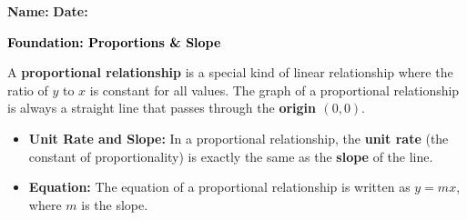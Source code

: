 \documentclass[12pt, letterpaper, fleqn]{article}
\begin{document}
\textbf{Name:} \underline{\hspace{5cm}}
\hfill
\textbf{Date:} \underline{\hspace{3cm}}\\

\begin{tcolorbox}[colback=customteal!20]
    \large\textcolor{black}{\textbf{Foundation: Proportions \& Slope}}
\end{tcolorbox}

\vspace{3mm}

\noindent
A \textbf{proportional relationship} is a special kind of linear relationship where the ratio of $y$ to $x$ is constant for all values. The graph of a proportional relationship is always a straight line that passes through the \textbf{origin $(0,0)$}.

\begin{itemize}
    \item \textbf{Unit Rate and Slope:} In a proportional relationship, the \textbf{unit rate} (the constant of proportionality) is exactly the same as the \textbf{slope} of the line.
    \item \textbf{Equation:} The equation of a proportional relationship is written as $y = mx$, where $m$ is the slope.
\end{itemize}

\vspace{4mm}
\end{document}
